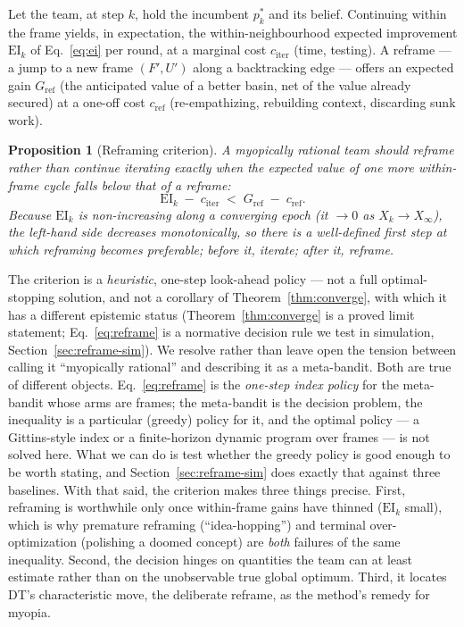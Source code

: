 \documentclass[11pt]{article}
\newtheorem{proposition}{Proposition}
\begin{document}
Let the team, at step $k$, hold the incumbent $p_k^*$ and its belief. Continuing within the frame yields, in expectation, the within-neighbourhood expected improvement $\mathrm{EI}_k$ of Eq.~\eqref{eq:ei} per round, at a marginal cost $c_{\text{iter}}$ (time, testing). A reframe --- a jump to a new frame $(F',U')$ along a backtracking edge --- offers an expected gain $G_{\text{ref}}$ (the anticipated value of a better basin, net of the value already secured) at a one-off cost $c_{\text{ref}}$ (re-empathizing, rebuilding context, discarding sunk work).

\begin{proposition}[Reframing criterion]
\label{prop:reframe}
A myopically rational team should reframe rather than continue iterating exactly when the expected value of one more within-frame cycle falls below that of a reframe:
\begin{equation}
\label{eq:reframe}
\mathrm{EI}_k \;-\; c_{\text{iter}} \;<\; G_{\text{ref}} \;-\; c_{\text{ref}} .
\end{equation}
Because $\mathrm{EI}_k$ is non-increasing along a converging epoch (it $\to 0$ as $X_k\to X_\infty$), the left-hand side decreases monotonically, so there is a well-defined first step at which reframing becomes preferable; before it, iterate; after it, reframe.
\end{proposition}

\noindent The criterion is a \emph{heuristic}, one-step look-ahead policy --- not a full optimal-stopping solution, and not a corollary of Theorem~\ref{thm:converge}, with which it has a different epistemic status (Theorem~\ref{thm:converge} is a proved limit statement; Eq.~\eqref{eq:reframe} is a normative decision rule we test in simulation, Section~\ref{sec:reframe-sim}). We resolve rather than leave open the tension between calling it ``myopically rational'' and describing it as a meta-bandit. Both are true of different objects. Eq.~\eqref{eq:reframe} is the \emph{one-step index policy} for the meta-bandit whose arms are frames; the meta-bandit is the decision problem, the inequality is a particular (greedy) policy for it, and the optimal policy --- a Gittins-style index or a finite-horizon dynamic program over frames --- is not solved here. What we can do is test whether the greedy policy is good enough to be worth stating, and Section~\ref{sec:reframe-sim} does exactly that against three baselines. With that said, the criterion makes three things precise. First, reframing is worthwhile only once within-frame gains have thinned ($\mathrm{EI}_k$ small), which is why premature reframing (``idea-hopping'') and terminal over-optimization (polishing a doomed concept) are \emph{both} failures of the same inequality. Second, the decision hinges on quantities the team can at least estimate rather than on the unobservable true global optimum. Third, it locates DT's characteristic move, the deliberate reframe, as the method's remedy for myopia.
\end{document}
